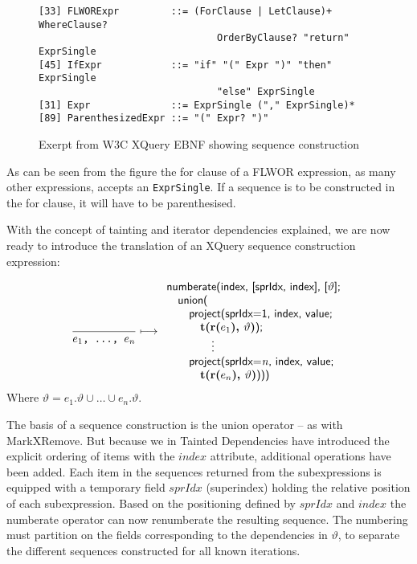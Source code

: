 \begin{figure}[h]
\begin{Verbatim}
[33] FLWORExpr         ::= (ForClause | LetClause)+ WhereClause? 
                               OrderByClause? "return" ExprSingle
[45] IfExpr            ::= "if" "(" Expr ")" "then" ExprSingle 
                               "else" ExprSingle
[31] Expr              ::= ExprSingle ("," ExprSingle)*
[89] ParenthesizedExpr ::= "(" Expr? ")"
\end{Verbatim}
\caption[Exerpt from W3C XQuery EBNF]{Exerpt from W3C XQuery EBNF showing sequence construction}
\label{fig:trans:TD:seqEBNF}
\end{figure}

As can be seen from the figure the for clause of a FLWOR expression, as many other expressions, accepts an
\texttt{ExprSingle}. If a sequence is to be constructed in the for clause, it will have to be parenthesised. 

With the concept of tainting and iterator dependencies explained, we are now ready to introduce the translation of
an XQuery sequence construction expression:

\begin{equation}
\frac{}{e_{1}\mbox{\texttt{, \ldots, }}e_{n}}\longmapsto
\begin{array}{l}
\mbox{\textsf{numberate(index, [sprIdx, index], [}}\vartheta\mbox{\textsf{];}} \\ \quad
\mbox{\textsf{union(}} \\ \quad \quad
\mbox{\textsf{project(sprIdx=1, index, value; }} \\ \quad \quad \quad
\mbox{\textbf{t(r(}}e_{1}\mbox{\textbf{), }}\vartheta\mbox{\textbf{)}\textsf{);}} \\ \quad \quad
\qquad\vdots\\ \quad \quad
\mbox{\textsf{project(sprIdx=}\textit{n}\textsf{, index, value; }} \\ \quad \quad \quad
\mbox{\textbf{t(r(}}e_{n}\mbox{\textbf{), }}\vartheta\mbox{\textbf{)}\textsf{)))}}
\end{array}
\label{rule:trans:TD:seqConstr}
\end{equation}
Where $\vartheta=e_{1}.\vartheta \cup \ldots \cup e_{n}.\vartheta$.

The basis of a sequence construction is the \textsf{union} operator -- as with MarkXRemove. But because we in
Tainted Dependencies have introduced the explicit ordering of items with the $index$ attribute, additional
operations have been added. Each item in the sequences returned from the subexpressions is equipped with a
temporary field $sprIdx$ (superindex) holding the relative position of each subexpression. Based on the
positioning defined by $sprIdx$ and $index$ the \textsf{numberate} operator can now renumberate the resulting
sequence. The numbering must partition on the fields corresponding to the dependencies in $\vartheta$, to separate
the different sequences constructed for all known iterations.


